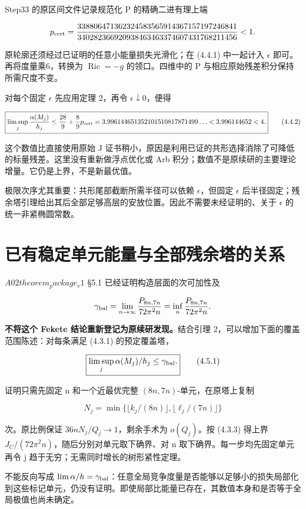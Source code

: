 \documentclass[UTF8,11pt,fontset=none]{ctexart}
\theoremstyle{definition}
\theoremstyle{remark}
\begin{document}
Step33 的原区间文件记录规范化 P 的精确二进有理上端

\[
p_{\rm cert}=
\frac{338806471362324583565914367157197246841}
{340282366920938463463374607431768211456}
<1.
\]

原轮廓还须经过已证明的任意小能量损失光滑化；在 (4.4.1) 中一起计入 \(\epsilon\) 即可。再将度量乘6，转换为 \(\operatorname{Ric}=-g\) 的领口。四维中的 P 与相应原始残差积分保持所需尺度不变。

对每个固定 \(\epsilon\) 先应用定理 2，再令 \(\epsilon\downarrow0\)，便得

\[
\boxed{
\limsup_j\frac{\alpha(M_j)}{h_j}
\le\frac{28}{9}+\frac89p_{\rm cert}
=3.996144651352101510817871499\ldots
<3.996144652<4.
}
\tag{4.4.2}
\]

这个数值比直接使用原始 J 证书稍小，原因是利用已证的共形选择消除了可降低的标量残差。这里没有重新做浮点优化或 Arb 积分；数值不是原续研的主要理论增量。它仍是上界，不是新最优值。

极限次序尤其重要：共形尾部截断所需半径可以依赖 \(\epsilon\)，但固定 \(\epsilon\) 后半径固定；残余塔引理给出其后全部足够高层的安放位置。因此不需要未经证明的、关于 \(\epsilon\) 的统一非紧椭圆常数。

\section{已有稳定单元能量与全部残余塔的关系}\label{v4-ux5df2ux6709ux7a33ux5b9aux5355ux5143ux80fdux91cfux4e0eux5168ux90e8ux6b8bux4f59ux5854ux7684ux5173ux7cfb}

\(A02 theorem_package_v1\) §5.1 已经证明构造层面的次可加性及

\[
\gamma_{\rm bal}
=\lim_{n\to\infty}\frac{\mathfrak P_{8n,7n}}{72\pi^2n}
=\inf_n\frac{\mathfrak P_{8n,7n}}{72\pi^2n}.
\]

\textbf{不将这个 Fekete 结论重新登记为原续研发现。}结合引理 2，可以增加下面的覆盖范围陈述：对每条满足 (4.3.1) 的预定覆盖塔，

\[
\boxed{\limsup_j\alpha(M_j)/h_j\le\gamma_{\rm bal}.}
\tag{4.5.1}
\]

证明只需先固定 n 和一个近最优完整 \((8n,7n)\)-单元，在原塔上复制

\[
N_j=\min\{\lfloor k_j/(8n)\rfloor,\lfloor\ell_j/(7n)\rfloor\}
\]

次。原比例保证 \(36nN_j/Q_j\to1\)，剩余手术为 \(o(Q_j)\)。按 (4.3.3) 得上界 \(J_C/(72\pi^2n)\)，随后分别对单元取下确界、对 n 取下确界。每一步均先固定单元再令 j 趋于无穷；无需同时增长的树形紧性定理。

不能反向写成 \(\lim\alpha/h=\gamma_{\rm bal}\)：任意全局竞争度量是否能够以足够小的损失局部化到这些标记单元，仍没有证明。即使局部比能量已存在，其数值本身和是否等于全局极值也尚未确定。
\end{document}
